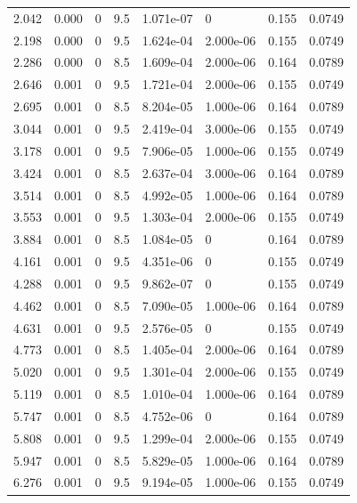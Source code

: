 \documentclass[preview]{standalone}
\begin{document}
{{\begin{tabular}{L{1.2cm}C{1.2cm} C{0.3cm}C{0.5cm} C{1.4cm}C{1.4cm} C{1.4cm}C{1.4cm}}
  2.042  &  0.000  & 0     & 9.5 &  1.071e-07  & 0  & 0.155 &  0.0749   \\ 
  2.198  &  0.000  & 0     & 9.5 &  1.624e-04  & 2.000e-06  & 0.155 &  0.0749   \\ 
  2.286  &  0.000  & 0     & 8.5 &  1.609e-04  & 2.000e-06  & 0.164 &  0.0789   \\ 
  2.646  &  0.001  & 0     & 9.5 &  1.721e-04  & 2.000e-06  & 0.155 &  0.0749   \\ 
  2.695  &  0.001  & 0     & 8.5 &  8.204e-05  & 1.000e-06  & 0.164 &  0.0789   \\ 
  3.044  &  0.001  & 0     & 9.5 &  2.419e-04  & 3.000e-06  & 0.155 &  0.0749   \\ 
  3.178  &  0.001  & 0     & 9.5 &  7.906e-05  & 1.000e-06  & 0.155 &  0.0749   \\ 
  3.424  &  0.001  & 0     & 8.5 &  2.637e-04  & 3.000e-06  & 0.164 &  0.0789   \\ 
  3.514  &  0.001  & 0     & 8.5 &  4.992e-05  & 1.000e-06  & 0.164 &  0.0789   \\ 
  3.553  &  0.001  & 0     & 9.5 &  1.303e-04  & 2.000e-06  & 0.155 &  0.0749   \\ 
  3.884  &  0.001  & 0     & 8.5 &  1.084e-05  & 0  & 0.164 &  0.0789   \\ 
  4.161  &  0.001  & 0     & 9.5 &  4.351e-06  & 0  & 0.155 &  0.0749   \\ 
  4.288  &  0.001  & 0     & 9.5 &  9.862e-07  & 0  & 0.155 &  0.0749   \\ 
  4.462  &  0.001  & 0     & 8.5 &  7.090e-05  & 1.000e-06  & 0.164 &  0.0789   \\ 
  4.631  &  0.001  & 0     & 9.5 &  2.576e-05  & 0  & 0.155 &  0.0749   \\ 
  4.773  &  0.001  & 0     & 8.5 &  1.405e-04  & 2.000e-06  & 0.164 &  0.0789   \\ 
  5.020  &  0.001  & 0     & 9.5 &  1.301e-04  & 2.000e-06  & 0.155 &  0.0749   \\ 
  5.119  &  0.001  & 0     & 8.5 &  1.010e-04  & 1.000e-06  & 0.164 &  0.0789   \\ 
  5.747  &  0.001  & 0     & 8.5 &  4.752e-06  & 0  & 0.164 &  0.0789   \\ 
  5.808  &  0.001  & 0     & 9.5 &  1.299e-04  & 2.000e-06  & 0.155 &  0.0749   \\ 
  5.947  &  0.001  & 0     & 8.5 &  5.829e-05  & 1.000e-06  & 0.164 &  0.0789   \\ 
  6.276  &  0.001  & 0     & 9.5 &  9.194e-05  & 1.000e-06  & 0.155 &  0.0749   \\ 

\end{tabular}}}
\end{document}
